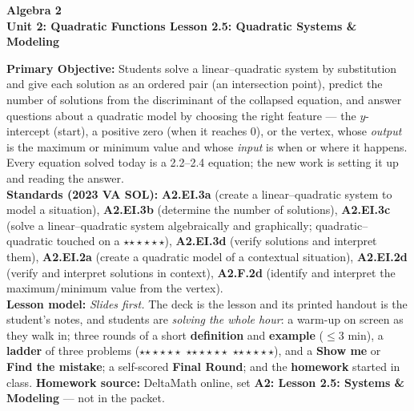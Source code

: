\documentclass[10pt]{article}
\newcommand{\CourseName}{Algebra 2}
\newcommand{\UnitNumberName}{Unit 2: Quadratic Functions \quad}
\newcommand{\LessonNumberName}{Lesson 2.5: Quadratic Systems \& Modeling}
\newcommand{\rung}[1]{{\color{goldacc}\ifcase#1\or$\star$\or$\star\star$\or$\star\star\star$\fi}}
\begin{document}
\begin{center}
    {\Large\bfseries \CourseName \\
    {\small\bfseries \UnitNumberName \LessonNumberName}}
\end{center}

\begin{tcolorbox}[colback=forestbg, colframe=forest, boxrule=0.9pt, arc=2mm,
    left=2mm, right=2mm, top=1.5mm, bottom=1.5mm]
    \textbf{Primary Objective:} Students solve a linear--quadratic system by substitution and
    give each solution as an ordered pair (an intersection point), predict the number of
    solutions from the discriminant of the collapsed equation, and answer questions about a
    quadratic model by choosing the right feature --- the $y$-intercept (start), a positive zero
    (when it reaches $0$), or the vertex, whose \emph{output} is the maximum or minimum value and
    whose \emph{input} is when or where it happens. Every equation solved today is a 2.2--2.4
    equation; the new work is setting it up and reading the answer.
    \\[2pt]
    \textbf{Standards (2023 VA SOL):} \textbf{A2.EI.3a} (create a linear--quadratic system to
    model a situation), \textbf{A2.EI.3b} (determine the number of solutions), \textbf{A2.EI.3c}
    (solve a linear--quadratic system algebraically and graphically; quadratic--quadratic touched
    on a \rung3), \textbf{A2.EI.3d} (verify solutions and interpret them), \textbf{A2.EI.2a}
    (create a quadratic model of a contextual situation), \textbf{A2.EI.2d} (verify and interpret
    solutions in context), \textbf{A2.F.2d} (identify and interpret the maximum/minimum value
    from the vertex).
    \\[2pt]
    \textbf{Lesson model:} \emph{Slides first.} The deck is the lesson and its printed handout is
    the student's notes, and students are \emph{solving the whole hour}: a warm-up on screen as
    they walk in; three rounds of a short \textbf{definition} and \textbf{example} ($\le$3 min), a
    \textbf{ladder} of three problems (\rung1\ \rung2\ \rung3), and a \textbf{Show me} or
    \textbf{Find the mistake}; a self-scored \textbf{Final Round}; and the \textbf{homework}
    started in class. \textbf{Homework source:} DeltaMath online, set
    \textbf{A2: Lesson 2.5: Systems \& Modeling} --- not in the packet.
\end{tcolorbox}
\end{document}
